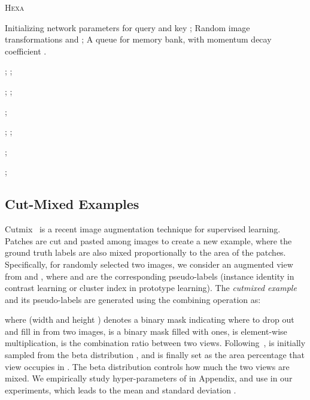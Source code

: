 \documentclass[10pt,twocolumn,letterpaper]{article}
\newcommand{\shortname}{\textsc{Hexa}}
\begin{document}
\begin{algorithm}[!t]
   \caption{\shortname{} }
   \label{alg:sat_moco}
\begin{algorithmic}[1]
    \Require Initializing network parameters for query  and key ; Random image transformations  and ; A queue  for memory bank, with momentum decay coefficient .
   
        \State {\quad {\small \color{blue} }}    
        ;
        ;
        
        \State{\quad {\small \color{blue} }}  
        ;
        ;

        \State{\quad {\small \color{blue} }}  
        ;

        \State{\quad {\small \color{blue} }} 
        ;
        ;
        
        \State{\quad {\small \color{blue} }} 
        \State {\quad };

        \State{\quad {\small \color{blue} }} 
        ;
   \EndFor
\end{algorithmic}
\end{algorithm}

\vspace{-0mm}
\subsection{Cut-Mixed Examples}

Cutmix~\cite{yun2019cutmix} is a recent image augmentation technique for supervised learning. Patches are cut and pasted among images to create a new example, where the ground truth labels are also mixed proportionally to the area of the patches.
Specifically, for randomly selected two images, we consider an augmented view from   and , where  and  are the corresponding pseudo-labels (\ie instance identity in contrast learning or cluster index in prototype learning). 
The {\em cutmixed example}  and its pseudo-labels  are generated using the combining operation as:

where  (width  and height ) denotes a binary mask indicating where to drop out and fill in from two images,  is a binary
mask filled with ones,  is element-wise multiplication,  is the combination ratio between two views. Following~\cite{yun2019cutmix},  is initially sampled from the beta distribution , and is finally set as the area percentage that view  occupies in . The beta distribution controls how much the two views are mixed. We empirically study  hyper-parameters of  in Appendix, and use  in our experiments, which leads to the mean  and standard deviation .
\end{document}
